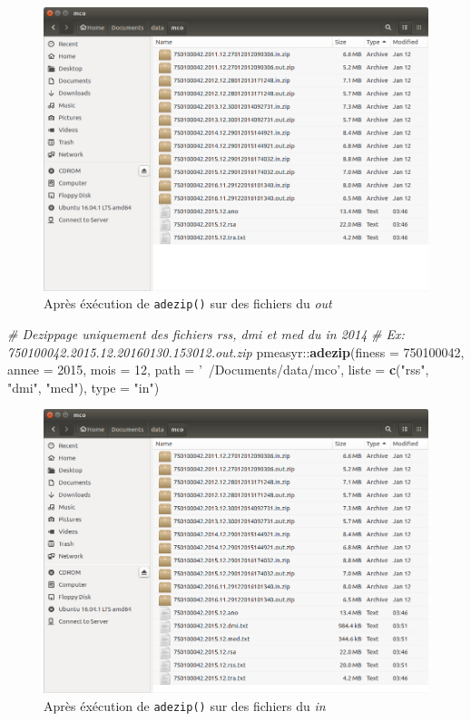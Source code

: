 \documentclass[]{book}
\newenvironment{Shaded}{\begin{snugshade}}{\end{snugshade}}
\newcommand{\KeywordTok}[1]{\textcolor[rgb]{0.13,0.29,0.53}{\textbf{{#1}}}}
\newcommand{\DataTypeTok}[1]{\textcolor[rgb]{0.13,0.29,0.53}{{#1}}}
\newcommand{\DecValTok}[1]{\textcolor[rgb]{0.00,0.00,0.81}{{#1}}}
\newcommand{\StringTok}[1]{\textcolor[rgb]{0.31,0.60,0.02}{{#1}}}
\newcommand{\CommentTok}[1]{\textcolor[rgb]{0.56,0.35,0.01}{\textit{{#1}}}}
\newcommand{\NormalTok}[1]{{#1}}
\begin{document}
\begin{figure}[htbp]
\centering
\includegraphics{images/archives_dezip.png}
\caption{Après éxécution de \texttt{adezip()} sur des fichiers du
\emph{out}}
\end{figure}

\begin{Shaded}
\begin{Highlighting}[]
\CommentTok{# Dezippage uniquement des fichiers rss, dmi et med du in 2014}
\CommentTok{# Ex: 750100042.2015.12.20160130.153012.out.zip}
\NormalTok{pmeasyr::}\KeywordTok{adezip}\NormalTok{(}\DataTypeTok{finess =} \DecValTok{750100042}\NormalTok{, }
                \DataTypeTok{annee =} \DecValTok{2015}\NormalTok{, }
                \DataTypeTok{mois =} \DecValTok{12}\NormalTok{, }
                \DataTypeTok{path =} \StringTok{'~/Documents/data/mco'}\NormalTok{, }
                \DataTypeTok{liste =} \KeywordTok{c}\NormalTok{(}\StringTok{"rss"}\NormalTok{, }\StringTok{"dmi"}\NormalTok{, }\StringTok{"med"}\NormalTok{), }
                \DataTypeTok{type =} \StringTok{"in"}\NormalTok{)}
\end{Highlighting}
\end{Shaded}

\begin{figure}[htbp]
\centering
\includegraphics{images/archives_mco_in.png}
\caption{Après éxécution de \texttt{adezip()} sur des fichiers du
\emph{in}}
\end{figure}
\end{document}
